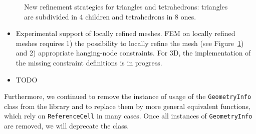 \documentclass{ansarticle-preprint}
\begin{document}
\begin{figure}[!t]
  
  \caption{New refinement strategies for triangles and tetrahedrons: triangles
  are subdivided in 4 children and tetrahedrons in 8 ones.}\label{fig:refinement}
  
\end{figure}

\begin{itemize}
\item Experimental support of locally refined meshes. FEM on locally refined
meshes requires 1) the possibility to locally refine the mesh (see Figure~\ref{fig:refinement})
and 2) appropriate hanging-node constraints. For 3D, the implementation of the missing constraint definitions is in progress.
\item TODO
\end{itemize}

Furthermore, we continued to remove the instance of usage of the \texttt{GeometryInfo} class from
the library and to replace them by more general equivalent functions, which
rely on \texttt{ReferenceCell} in many cases. Once all instances of 
\texttt{GeometryInfo} are removed, we will deprecate the class.
\end{document}
